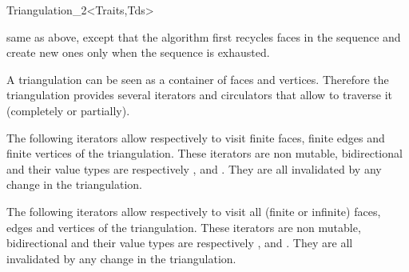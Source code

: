 \begin{ccRefClass}{Triangulation_2<Traits,Tds>}
\begin{ccAdvanced}
{same as above, except that the  algorithm 
first recycles faces in the sequence \ccc{[face_begin, 
face_end[} 
and create new ones only when the sequence is exhausted.}
\end{ccAdvanced}




A triangulation can be seen as a container of faces and vertices.
Therefore the triangulation provides several iterators and circulators
that allow to traverse it (completely or partially).




The following iterators allow respectively to visit 
finite faces,  finite edges and  finite vertices
of the triangulation. These iterators are non mutable, bidirectional
and their value types are respectively
,  and . 
They are all invalidated by any change in the triangulation.

\ccGlue
{}

\ccGlue
{}

\ccGlue
{}
\ccGlue
{}
\ccGlue
{}

The following iterators allow respectively to visit all
(finite or infinite) faces, edges and vertices
of the triangulation. These iterators are non mutable, bidirectional
and their value types are respectively
,  and . 
They are all invalidated by any change in the triangulation.


\ccGlue
{}


\end{ccRefClass}
